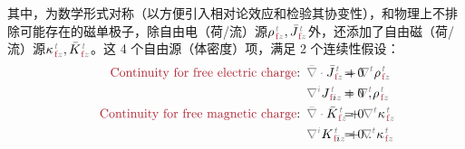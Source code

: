 其中，为数学形式对称（以方便引入相对论效应和检验其协变性\cite{lakhtakiaCovariancesInvariancesMaxwell1995,chen-zhuChenZhuxieUndergraduate_courses2024}），和物理上不排除可能存在的磁单极子，除自由电（荷/流）源${\rho}^{\;\!\mathcolor{gray}{t}}_{\;\!\textcolor{Maroon}{\text{f}}\mathcolor{gray}{z}}, \bar{J}^{\;\!\mathcolor{gray}{t}}_{\;\!\textcolor{Maroon}{\text{f}}\mathcolor{gray}{z}}$外，还添加了自由磁（荷/流）源${\kappa}^{\;\!\mathcolor{gray}{t}}_{\;\!\textcolor{Maroon}{\text{f}}\mathcolor{gray}{z}}, \bar{K}^{\;\!\mathcolor{gray}{t}}_{\;\!\textcolor{Maroon}{\text{f}}\mathcolor{gray}{z}}$\cite{lakhtakiaCovariancesInvariancesMaxwell1995}。这 4 个自由源（体密度）项，满足 2 个连续性假设\cite{mackayElectromagneticAnisotropyBianisotropy2019,lakhtakiaCovariancesInvariancesMaxwell1995,chen-zhuChenZhuxieUndergraduate_courses2024}：
\begin{subequations} \label{eq:Div-em-f}
\begin{align}
	\textcolor{Maroon}{\text{Continuity for free electric charge}}\text{:}&\hspace{0.5em} \mathcolor{gray}{\bar{\nabla} \cdot} \bar{J}^{\;\!\mathcolor{gray}{t}}_{\;\!\textcolor{Maroon}{\text{f}}\mathcolor{gray}{z}} + \mathcolor{gray}{\nabla^t} {\rho}^{\;\!\mathcolor{gray}{t}}_{\;\!\textcolor{Maroon}{\text{f}}\mathcolor{gray}{z}} \hspace{-5.3em} &&= 0 \label{eq:Div-e-f} \\ 
	&\hspace{0.5em} \mathcolor{gray}{\nabla^i} J^{\;\!\mathcolor{gray}{t}}_{\;\!\textcolor{Maroon}{\text{f}} i\mathcolor{gray}{z}} + \mathcolor{gray}{\nabla^t} {\rho}^{\;\!\mathcolor{gray}{t}}_{\;\!\textcolor{Maroon}{\text{f}}\mathcolor{gray}{z}} \hspace{-5.3em} &&= 0~, \label{eq:div-e-f} \\ 
	\textcolor{Maroon}{\text{Continuity for free magnetic charge}}\text{:}&\hspace{0.5em} \mathcolor{gray}{\bar{\nabla} \cdot} \bar{K}^{\;\!\mathcolor{gray}{t}}_{\;\!\textcolor{Maroon}{\text{f}}\mathcolor{gray}{z}} + \mathcolor{gray}{\nabla^t} {\kappa}^{\;\!\mathcolor{gray}{t}}_{\;\!\textcolor{Maroon}{\text{f}}\mathcolor{gray}{z}} \hspace{-5.3em} &&= 0 \label{eq:Div-m-f} \\
	&\hspace{0.5em} \mathcolor{gray}{\nabla^i} K^{\;\!\mathcolor{gray}{t}}_{\;\!\textcolor{Maroon}{\text{f}} i\mathcolor{gray}{z}} + \mathcolor{gray}{\nabla^t} {\kappa}^{\;\!\mathcolor{gray}{t}}_{\;\!\textcolor{Maroon}{\text{f}}\mathcolor{gray}{z}} \hspace{-5.3em} &&= 0~. \label{eq:div-m-f}
\end{align}
\end{subequations}
